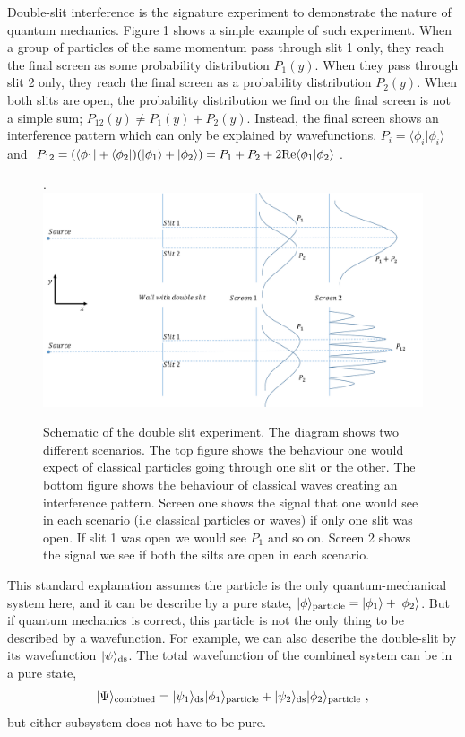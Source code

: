 \documentclass[aps,showpacs,onecolumn,floats,prd,superscriptaddress,nofootinbib]{revtex4-1}
\begin{document}
Double-slit interference is the signature experiment to demonstrate the nature of quantum mechanics. Figure 1 shows a simple example of such experiment.
When a group of particles of the same momentum pass through slit 1 only, they reach the final screen as some probability distribution $P_1(y)$. 
When they pass through slit 2 only, they reach the final screen as a probability distribution $P_2(y)$.
When both slits are open, the probability distribution we find on the final screen is not a simple sum; $P_{12}(y) \neq P_1(y) + P_2(y)$.
Instead, the final screen shows an interference pattern which can only be explained by wavefunctions.
$P_i = \langle \phi_i | \phi_i \rangle$ and $P_{12} = (\langle \phi_1|+\langle \phi_2| ) (|\phi_1\rangle + | \phi_2 \rangle)=P_1 + P_2 + 2{\rm Re}\langle\phi_1|\phi_2\rangle$.

\begin{figure}[h!]
\begin{center}.
\includegraphics[scale = 0.5]{DSe.pdf}
\caption{Schematic of the double slit experiment. 
The diagram shows two different scenarios. 
The top figure shows the behaviour one would expect of classical particles going through one slit or the other. 
The bottom figure shows the behaviour of classical waves creating an interference pattern. 
Screen one shows the signal that one would see in each scenario (i.e classical particles or waves) if only one slit was open. 
If slit 1 was open we would see $P_1$ and so on. Screen 2 shows the signal we see if both the silts are open in each scenario.}
\label{fig-doubleslit}
\end{center}
\end{figure}

This standard explanation assumes the particle is the only quantum-mechanical system here, and it can be describe by a pure state, $|\phi\rangle_{\rm particle} = |\phi_1\rangle + |\phi_2\rangle$.
But if quantum mechanics is correct, this particle is not the only thing to be described by a wavefunction. 
For example, we can also describe the double-slit by its wavefunction $|\psi\rangle_{\rm ds}$. The total wavefunction of the combined system can be in a pure state,
\begin{equation}
|\Psi\rangle_{\rm combined} = |\psi_1\rangle_{\rm ds}|\phi_1\rangle_{\rm particle} 
+ |\psi_2\rangle_{\rm ds}|\phi_2\rangle_{\rm particle} ~,
\end{equation}
but either subsystem does not have to be pure.
\end{document}
